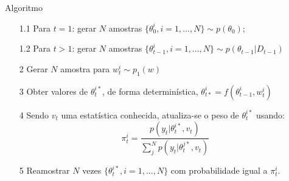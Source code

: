 \documentclass{beamer}
\begin{document}
\begin{frame}{Algoritmo}

\begin{itemize}
\item[1.1] Para $t=1$: gerar $N$ amostras $\{\theta_{0}^{i}, i= 1,...,N\} \sim p(\theta_0)$;
\item[1.2] Para $t>1$: gerar $N$ amostras $\{\theta_{t-1}^{i}, i= 1,...,N\}\sim p(\theta_{t-1}|D_{t-1})$
\end{itemize}
\begin{itemize}
\item[2] Gerar $N$ amostra para $w_{t}^{i} \sim p_1(w)$
\item[3] Obter valores de $\theta^{i*}_{t}$, de forma determinística, $\theta_{t*}^{i} = f(\theta_{t-1}^{i},w_{t}^{i})$
\item[4] Sendo $v_t$ uma estatística conhecida, atualiza-se o peso de $\theta^{i*}_{t}$ usando:
$$
\pi^{i}_t = \frac{p(y_t|\theta_t^{i*},v_t)}{\sum^N_j p(y_t|\theta_t^{j*},v_t)}
$$
\item[5] Reamostrar $N$ vezes $\{\theta_{t}^{i*}, i= 1,...,N\}$ com probabilidade igual a $\pi_{t}^{i}$.
\end{itemize}

\end{frame}

\begin{frame}[allowframebreaks]%
    {\tiny
    
    
    }
\end{frame}
\end{document}
